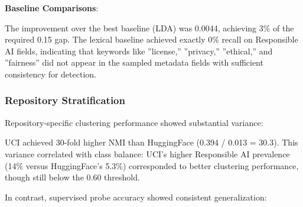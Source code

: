 \textbf{Baseline Comparisons}:

\begin{table}[htbp]
\centering
{}
\end{table}

The improvement over the best baseline (LDA) was 0.0044, achieving 3\% of the required 0.15 gap. The lexical baseline achieved exactly 0\% recall on Responsible AI fields, indicating that keywords like ''license,'' ''privacy,'' ''ethical,'' and ''fairness'' did not appear in the sampled metadata fields with sufficient consistency for detection.

\subsubsection{Repository Stratification}

Repository-specific clustering performance showed substantial variance:

\begin{table}[htbp]
\centering
{}
\end{table}

UCI achieved 30-fold higher NMI than HuggingFace (0.394 / 0.013 = 30.3). This variance correlated with class balance: UCI's higher Responsible AI prevalence (14\% versus HuggingFace's 5.3\%) corresponded to better clustering performance, though still below the 0.60 threshold.

In contrast, supervised probe accuracy showed consistent generalization:

\begin{table}[htbp]
\centering
{}
\end{table}

